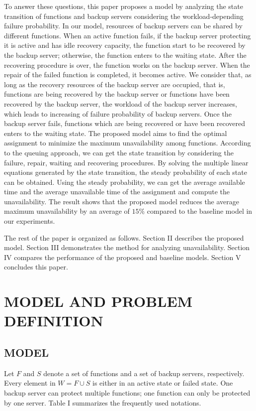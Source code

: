 \documentclass[conference]{IEEEtran}
\begin{document}
To answer these questions, this paper proposes a model by analyzing the state transition of functions and backup servers considering the workload-depending failure probability. In our model, resources of backup servers can be shared by different functions. When an active function fails, if the backup server protecting it is active and has idle recovery capacity, the function start to be recovered by the backup server; otherwise, the function enters to the waiting state. After the recovering procedure is over, the function works on the backup server. When the repair of the failed function is completed, it becomes active. We consider that, as long as the recovery resources of the backup server are occupied, that is, functions are being recovered by the backup server or functions have been recovered by the backup server, the workload of the backup server increases, which leads to increasing of failure probability of backup servers. Once the backup server fails, functions which are being recovered or have been recovered enters to the waiting state. The proposed model aims to find the optimal assignment to minimize the maximum unavailability among functions. According to the queuing approach, we can get the state transition by considering the failure, repair, waiting and recovering procedures. By solving the multiple linear equations generated by the state transition, the steady probability of each state can be obtained. Using the steady probability, we can get the average available time and the average unavailable time of the assignment and compute the unavailability. The result shows that the proposed model reduces the average maximum unavailability by an average of $15\%$ compared to the baseline model in our experiments.

The rest of the paper is organized as follows. Section II describes the proposed model. Section III demonstrates the method for analyzing unavailability. Section IV compares the performance of the proposed and baseline models. Section V concludes this paper.


\section{MODEL AND PROBLEM DEFINITION}
\subsection{MODEL}
Let $F$ and $S$ denote a set of functions and a set of backup servers, respectively. Every element in $W = F \cup S$ is either in an active state or failed state. One backup server can protect multiple functions; one function can only be protected by one server. Table I summarizes the frequently used notations.
\end{document}
